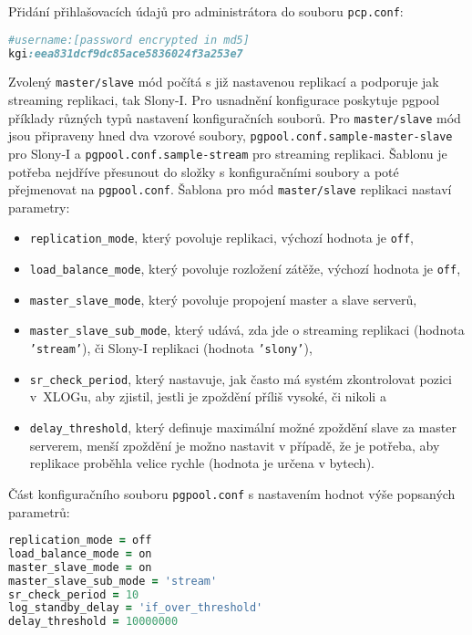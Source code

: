 Přidání přihlašovacích údajů pro administrátora do souboru \texttt{pcp.conf}:
\begin{lstlisting}[language=ruby]
#username:[password encrypted in md5]
kgi:eea831dcf9dc85ace5836024f3a253e7
\end{lstlisting}

Zvolený \texttt{master/slave} mód počítá s již nastavenou replikací a podporuje
jak streaming replikaci, tak Slony-I. Pro usnadnění konfigurace poskytuje
pgpool příklady různých typů nastavení konfiguračních souborů. Pro
\texttt{master/slave} mód jsou připraveny hned dva vzorové soubory,
\texttt{pgpool.conf.sample-master-slave} pro Slony-I a
\texttt{pgpool.conf.sample-stream} pro streaming replikaci. Šablonu je potřeba
nejdříve přesunout do složky s konfiguračními soubory a poté přejmenovat na
\texttt{pgpool.conf}. Šablona pro mód \texttt{master/slave} replikaci nastaví
parametry:
\begin{itemize}
  \item \texttt{replication\_mode}, který povoluje replikaci, výchozí hodnota je
    \texttt{off},
  \item \texttt{load\_balance\_mode}, který povoluje rozložení zátěže, výchozí
    hodnota je \texttt{off},
  \item \texttt{master\_slave\_mode}, který povoluje propojení master a slave
    serverů,
  \item \texttt{master\_slave\_sub\_mode}, který udává, zda jde o streaming
    replikaci (hodnota \texttt{'stream'}), či Slony-I replikaci (hodnota
    \texttt{'slony'}),
  \item \texttt{sr\_check\_period}, který nastavuje, jak často má systém
    zkontrolovat pozici v~XLOGu, aby zjistil, jestli je zpoždění příliš vysoké,
    či nikoli a
  \item \texttt{delay\_threshold}, který definuje maximální možné zpoždění slave
    za master serverem, menší zpoždění je možno nastavit v případě, že je
    potřeba, aby replikace proběhla velice rychle (hodnota je určena v bytech).
\end{itemize}

Část konfiguračního souboru \texttt{pgpool.conf} s nastavením hodnot výše
popsaných parametrů:
\begin{lstlisting}[language=ruby]
replication_mode = off
load_balance_mode = on
master_slave_mode = on
master_slave_sub_mode = 'stream'
sr_check_period = 10
log_standby_delay = 'if_over_threshold'
delay_threshold = 10000000
\end{lstlisting}

